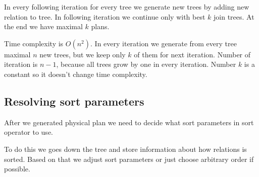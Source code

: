  In every following iteration for every tree we generate new trees by adding new relation to tree. In following iteration we continue only with best $k$ join trees. At the end we have maximal $k$ plans.
 
 Time complexity is $O(n^2)$. In every iteration we generate from every tree maximal $n$ new trees, but we keep only $k$ of them for next iteration. Number of iteration is $n-1$, because all trees grow by one in every iteration. Number $k$ is a constant so it doesn't change time complexity.
 
\subsection{Resolving sort parameters}

After we generated physical plan we need to decide what sort parameters in sort operator to use.

To do this we goes down the tree and store information about how relations is sorted. Based on that we adjust sort parameters or just choose arbitrary order if possible.

